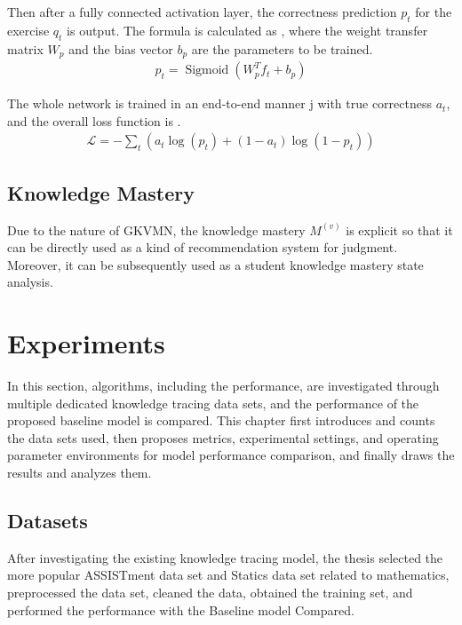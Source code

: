 Then after a fully connected activation layer, the correctness prediction \(p_t\) for the exercise \(q_t\) is output. The formula is calculated as \eqname{\ref{fml:ch3-predicting-function-p}}, where the weight transfer matrix \(W_p\) and the bias vector \(b_p\) are the parameters to be trained.
\begin{align}\label{fml:ch3-predicting-function-p}
    p_t = \operatorname{Sigmoid}(W_p^T f_t + b_p)
\end{align}

The whole network is trained in an end-to-end manner j with true correctness \(a_t\), and the overall loss function is \eqname{\ref{fml:ch3-loss}}.
\begin{align}\label{fml:ch3-loss}
    \mathcal{L} = -\sum\limits_{t}{(a_t\log(p_t)+(1-a_t)\log(1-p_t))}
\end{align}


\subsection{Knowledge Mastery}
Due to the nature of GKVMN, the knowledge mastery \(M^{(v)}\) is explicit so that it can be directly used as a kind of recommendation system for judgment. Moreover, it can be subsequently used as a student knowledge mastery state analysis.

\section{Experiments}
In this section, algorithms, including the performance, are investigated through multiple dedicated knowledge tracing data sets, and the performance of the proposed baseline model is compared. This chapter first introduces and counts the data sets used, then proposes metrics, experimental settings, and operating parameter environments for model performance comparison, and finally draws the results and analyzes them.

\subsection{Datasets}
After investigating the existing knowledge tracing model, the thesis selected the more popular ASSISTment data set and Statics data set related to mathematics, preprocessed the data set, cleaned the data, obtained the training set, and performed the performance with the Baseline model Compared.

